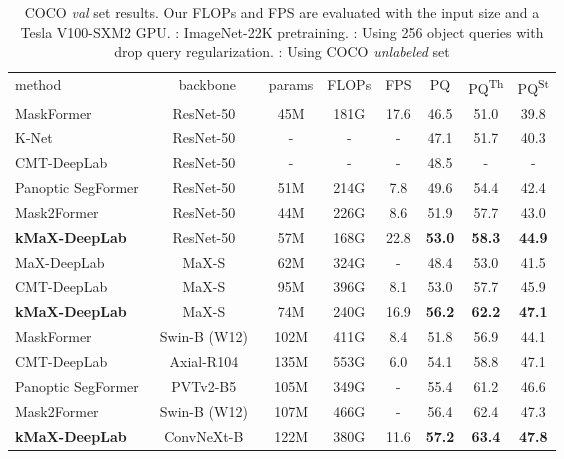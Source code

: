 \documentclass[runningheads]{llncs}
\newcommand{\tablestyle}[2]{\setlength{\tabcolsep}{#1}\renewcommand{\arraystretch}{#2}\centering\footnotesize}
\begin{document}
\begin{table*}[!t]
\centering
\small
\caption{COCO \textit{val} set results. Our FLOPs and FPS are evaluated with the input size  and a Tesla V100-SXM2 GPU. : ImageNet-22K pretraining. : Using 256 object queries with drop query regularization. : Using COCO \textit{unlabeled} set
}
\tablestyle{1pt}{0.9}
\begin{tabular}{l|c|ccc|ccc}
method & backbone & params & FLOPs & FPS & PQ & PQ\textsuperscript{Th} & PQ\textsuperscript{St}\\
\shline
MaskFormer~\cite{cheng2021per} & ResNet-50~\cite{he2016deep} & 45M & 181G & 17.6 & 46.5 & 51.0 & 39.8 \\
K-Net~\cite{zhang2021k} &  ResNet-50~\cite{he2016deep} & - & - & - & 47.1 & 51.7 & 40.3 \\
CMT-DeepLab~\cite{yu2022cmt}  &  ResNet-50~\cite{he2016deep} & - & - & - & 48.5 & - & - \\
Panoptic SegFormer~\cite{li2021panoptic}  &  ResNet-50~\cite{he2016deep} & 51M & 214G & 7.8 & 49.6 & 54.4 & 42.4 \\
Mask2Former~\cite{cheng2021masked}  &  ResNet-50~\cite{he2016deep} & 44M & 226G & 8.6 & 51.9 & 57.7 & 43.0 \\
\textbf{kMaX-DeepLab} & ResNet-50~\cite{he2016deep} & 57M & 168G & 22.8 & \textbf{53.0} & \textbf{58.3} & \textbf{44.9} \\
\hline
MaX-DeepLab~\cite{wang2021max} & MaX-S~\cite{wang2021max} & 62M & 324G & - & 48.4 & 53.0 & 41.5 \\
CMT-DeepLab & MaX-S~\cite{wang2021max} & 95M & 396G & 8.1 & 53.0 & 57.7 & 45.9 \\
\textbf{kMaX-DeepLab} & MaX-S~\cite{wang2021max} & 74M & 240G & 16.9 & \textbf{56.2} & \textbf{62.2} & \textbf{47.1} \\
\hline
MaskFormer~\cite{cheng2021per} & Swin-B (W12)~\cite{liu2021swin} & 102M & 411G & 8.4 & 51.8 & 56.9 & 44.1 \\
CMT-DeepLab~\cite{yu2022cmt} & Axial-R104~\cite{yu2022cmt} & 135M & 553G & 6.0 & 54.1 & 58.8 & 47.1 \\
Panoptic SegFormer~\cite{li2021panoptic} & PVTv2-B5~\cite{wang2021pvtv2} & 105M & 349G & - & 55.4 & 61.2 & 46.6 \\
Mask2Former~\cite{cheng2021masked} & Swin-B (W12)~\cite{liu2021swin} & 107M & 466G & - & 56.4 & 62.4 & 47.3 \\
\textbf{kMaX-DeepLab} & ConvNeXt-B~\cite{liu2022convnet} & 122M & 380G & 11.6 & \textbf{57.2} & \textbf{63.4} & \textbf{47.8} \\

\end{tabular}
\end{table*}
\end{document}
